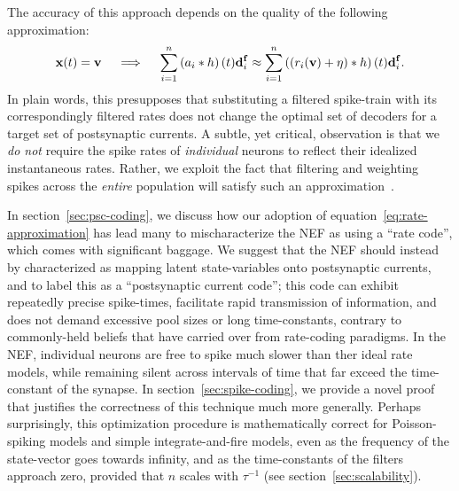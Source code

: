 
The accuracy of this approach depends on the quality of the following approximation:
\begin{equation} \label{eq:rate-approximation}
\mathbf{x}(t) = \mathbf{v} \quad \implies \quad \sum_{i=1}^n \left(a_i \ast h \right)(t) \mathbf{d}^{\mathbf{f}}_i \approx \sum_{i=1}^n \left( \left(r_i(\mathbf{v}) + \eta \right) \ast h \right)(t) \mathbf{d}^{\mathbf{f}}_i \text{.}
\end{equation}
In plain words, this presupposes that substituting a filtered spike-train with its correspondingly filtered rates does not change the optimal set of decoders for a target set of postsynaptic currents.
A subtle, yet critical, observation is that we \emph{do not} require the spike rates of \emph{individual} neurons to reflect their idealized instantaneous rates.
Rather, we exploit the fact that filtering and weighting spikes across the \emph{entire} population will satisfy such an approximation~\citep[][pp.~132--136]{eliasmith2003a}.

In section~\ref{sec:psc-coding}, we discuss how our adoption of equation~\ref{eq:rate-approximation} has lead many to mischaracterize the NEF as using a ``rate code'', which comes with significant baggage.
We suggest that the NEF should instead by characterized as mapping latent state-variables onto postsynaptic currents, and to label this as a ``postsynaptic current code''; this code can exhibit repeatedly precise spike-times, facilitate rapid transmission of information, and does not demand excessive pool sizes or long time-constants, contrary to commonly-held beliefs that have carried over from rate-coding paradigms.
In the NEF, individual neurons are free to spike much slower than ther ideal rate models, while remaining silent across intervals of time that far exceed the time-constant of the synapse.
In section~\ref{sec:spike-coding}, we provide a novel proof that justifies the correctness of this technique much more generally.
Perhaps surprisingly, this optimization procedure is mathematically correct for Poisson-spiking models and simple integrate-and-fire models, even as the frequency of the state-vector goes towards infinity, and as the time-constants of the filters approach zero, provided that $n$ scales with $\tau^{-1}$ (see section~\ref{sec:scalability}).


